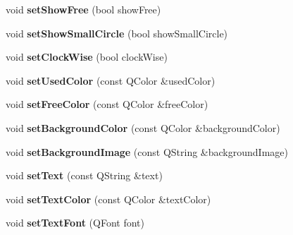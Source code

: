 \begin{DoxyCompactItemize}
\mbox{\label{class_q_qt_custom_progress_bar_ad5aa9b55c9a3172deef84706349b7e57}} 
void {\bfseries set\+Show\+Free} (bool show\+Free)
\item 
\mbox{\label{class_q_qt_custom_progress_bar_a43870f5a3b7bdd74b459cf59ca75de76}} 
void {\bfseries set\+Show\+Small\+Circle} (bool show\+Small\+Circle)
\item 
\mbox{\label{class_q_qt_custom_progress_bar_af0e83073046d1c660707d24582a956be}} 
void {\bfseries set\+Clock\+Wise} (bool clock\+Wise)
\item 
\mbox{\label{class_q_qt_custom_progress_bar_ab00c8f3e4d255a7b5f836894f71f2dad}} 
void {\bfseries set\+Used\+Color} (const Q\+Color \&used\+Color)
\item 
\mbox{\label{class_q_qt_custom_progress_bar_a88b877d1b47749ceb422c618bd8ef1df}} 
void {\bfseries set\+Free\+Color} (const Q\+Color \&free\+Color)
\item 
\mbox{\label{class_q_qt_custom_progress_bar_a0fd95fa46b803858bbbd5f821aa60ab7}} 
void {\bfseries set\+Background\+Color} (const Q\+Color \&background\+Color)
\item 
\mbox{\label{class_q_qt_custom_progress_bar_a9a74ab0d358b3b9f29627bab293542d9}} 
void {\bfseries set\+Background\+Image} (const Q\+String \&background\+Image)
\item 
\mbox{\label{class_q_qt_custom_progress_bar_a7992b8ec27eb2a8ab0d335b2658579af}} 
void {\bfseries set\+Text} (const Q\+String \&text)
\item 
\mbox{\label{class_q_qt_custom_progress_bar_a2ce3b4a4fa0158607ca14e1ce1aff9b2}} 
void {\bfseries set\+Text\+Color} (const Q\+Color \&text\+Color)
\item 
\mbox{\label{class_q_qt_custom_progress_bar_a0ff3e4431d8de12b726c1c81a6e12ba0}} 
void {\bfseries set\+Text\+Font} (Q\+Font font)

\end{DoxyCompactItemize}
